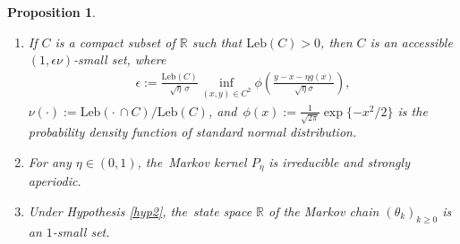 \documentclass[10pt,a4paper]{amsart}
\newtheorem{proposition}{Proposition}
\def\geq{\geqslant}
\begin{document}
\begin{proposition}\label{aperiodic}
	\begin{enumerate}
		\item[(1)] If $C$ is a compact subset of $\mathbb{R}$ such that $\mbox{Leb}(C)>0$,  then $C$ is an accessible $(1,\epsilon\nu)$-small set, where
		\begin{align}\label{Def-eps}
			\epsilon:=\frac{\mbox{Leb}(C)}{\sqrt{\eta}\,\sigma}\inf_{(x,y)\in C^2}\phi\left(\frac{y-x-\eta g(x)}{\sqrt{\eta}\sigma}\right),
		\end{align}
		$\nu(\cdot):=\mbox{Leb}(\cdot\,\cap C)/\mbox{Leb}(C)$, and~$\phi(x):=\frac{1}{\sqrt{2\pi}}\exp\{-x^2/2\}$ is the probability density function of standard normal distribution.
		\item[(2)] For any $\eta\in(0,1)$, the~Markov kernel $P_{\eta}$ is irreducible and strongly aperiodic.
		\item[(3)] Under Hypothesis \ref{hyp2}, the~state space $\mathbb{R}$ of the Markov chain $(\theta_k)_{k\geq0}$ is an $1$-small set.
	\end{enumerate}
\end{proposition}
\end{document}
